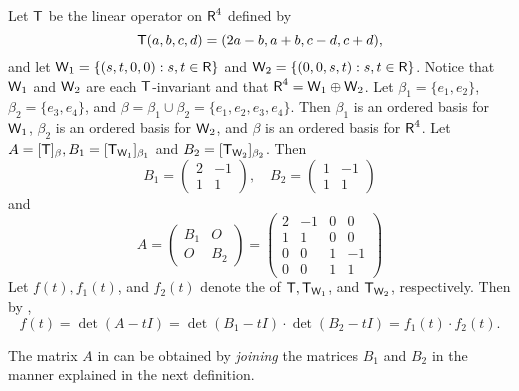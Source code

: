 \begin{example} \label{example 5.4.8}
Let \(\textsf{T}\) be the linear operator on \(\textsf{R}^4\) defined by
\[
    \textsf{T}(a, b, c, d) = (2a - b, a + b, c - d, c + d),
\]
and let \(\textsf{W}_1 = \{(s, t, 0, 0): s,t \in \textsf{R}\}\) and \(\textsf{W}_2 = \{(0, 0, s, t): s,t \in \textsf{R}\}\).
Notice that \(\textsf{W}_1\) and \(\textsf{W}_2\) are each \(\textsf{T}\)-invariant and that \(\textsf{R}^4 = \textsf{W}_1 \oplus \textsf{W}_2\).
Let \(\beta_1 = \{ e_1, e_2 \}\), \(\beta_2 = \{ e_3, e_4 \}\), and \(\beta = \beta_1 \cup \beta_2 = \{ e_1, e_2, e_3, e_4 \}\).
Then \(\beta_1\) is an ordered basis for \(\textsf{W}_1\), \(\beta_2\) is an ordered basis for \(\textsf{W}_2\), and \(\beta\) is an ordered basis for \(\textsf{R}^4\).
Let \(A= [\textsf{T}]_{\beta}, B_1 = [\textsf{T}_{\textsf{W}_1}]_{\beta_1}\) and \(B_2 = [\textsf{T}_{\textsf{W}_2}]_{\beta_2}\).
Then
\[
    B_1 = \begin{pmatrix} 2 & -1 \\ 1 & 1 \end{pmatrix}, \quad
    B_2 =\begin{pmatrix} 1 & -1 \\ 1 & 1 \end{pmatrix}
\]
and
\[
    A = \begin{pmatrix} B_1 & O \\ O & B_2 \end{pmatrix}
    = \begin{pmatrix}
        2 & -1 & 0 & 0 \\
        1 & 1 & 0 & 0 \\
        0 & 0 & 1 & -1 \\
        0 & 0 & 1 & 1
    \end{pmatrix}
\]
Let \(f(t), f_1(t)\), and \(f_{2}(t)\) denote the \CPOLY{} of \(\textsf{T}, \textsf{T}_{\textsf{W}_1}\), and \(\textsf{T}_{\textsf{W}_2}\), respectively.
Then by ,
\[
    f(t) = \det(A - tI) = \det(B_1 - tI) \cdot \det(B_2 - tI) = f_1(t) \cdot f_2(t).
\]
\end{example}

The matrix \(A\) in  can be obtained by \emph{joining} the matrices \(B_1\) and \(B_2\) in the manner explained in the next definition.

